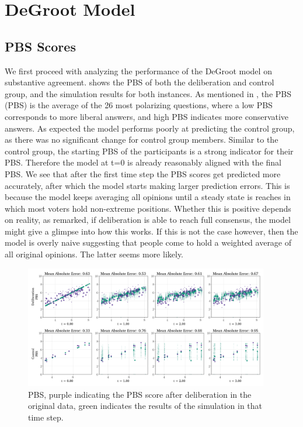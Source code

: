 \section{DeGroot Model} \label{degroot_results} \subsection{PBS Scores} We
first proceed with analyzing the performance of the DeGroot model on
substantive agreement.  shows the PBS of both the
deliberation and control group, and the simulation results for both instances.
As mentioned in , the PBS (PBS) is the
average of the 26 most polarizing questions, where a low PBS corresponds to
more liberal answers, and high PBS indicates more conservative answers. As
expected the model performs poorly at predicting the control group, as there
was no significant change for control group members. Similar to the control
group, the starting  PBS of the participants is a strong indicator for
their  PBS. Therefore the model at t=0 is already reasonably aligned with
the final  PBS. We see that after the first time step the PBS scores get
predicted more accurately, after which the model starts making larger
prediction errors. This is because the model keeps averaging all opinions until
a steady state is reaches in which most voters hold non-extreme positions.
Whether this is positive depends on reality, as
\citet{elsterMARKETFORUMThree2002} remarked, if deliberation is able to reach
full consensus, the model might give a glimpse into how this works. If this is
not the case however, then the model is overly naive suggesting that people
come to hold a weighted average of all original opinions. The latter seems more
likely.


\begin{figure}[h]
	\begin{center}
		\includegraphics[width=0.95\textwidth]{Figures/pbs_scores.png}
	\end{center}
	\caption{ PBS, purple indicating the PBS score after deliberation in the original data, green indicates the results of the simulation in that time step.}\label{fig:pbs}
\end{figure}

